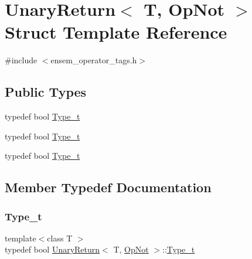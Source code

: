 \hypertarget{structUnaryReturn_3_01T_00_01OpNot_01_4}{}\section{Unary\+Return$<$ T, Op\+Not $>$ Struct Template Reference}
\label{structUnaryReturn_3_01T_00_01OpNot_01_4}


{\ttfamily \#include $<$ensem\+\_\+operator\+\_\+tags.\+h$>$}

\subsection*{Public Types}
\begin{DoxyCompactItemize}
\item 
typedef bool \mbox{\hyperlink{structUnaryReturn_3_01T_00_01OpNot_01_4_a3c2ea34de12d5f13e356568135a80bd9}{Type\+\_\+t}}
\item 
typedef bool \mbox{\hyperlink{structUnaryReturn_3_01T_00_01OpNot_01_4_a3c2ea34de12d5f13e356568135a80bd9}{Type\+\_\+t}}
\item 
typedef bool \mbox{\hyperlink{structUnaryReturn_3_01T_00_01OpNot_01_4_a3c2ea34de12d5f13e356568135a80bd9}{Type\+\_\+t}}
\end{DoxyCompactItemize}


\subsection{Member Typedef Documentation}
\mbox{\label{structUnaryReturn_3_01T_00_01OpNot_01_4_a3c2ea34de12d5f13e356568135a80bd9}} 
\subsubsection{\texorpdfstring{Type\_t}{Type\_t}\hspace{0.1cm}{\footnotesize\ttfamily [1/3]}}
{\footnotesize\ttfamily template$<$class T $>$ \\
typedef bool \mbox{\hyperlink{structUnaryReturn}{Unary\+Return}}$<$ T, \mbox{\hyperlink{structOpNot}{Op\+Not}} $>$\+::\mbox{\hyperlink{structUnaryReturn_3_01T_00_01OpNot_01_4_a3c2ea34de12d5f13e356568135a80bd9}{Type\+\_\+t}}}

\mbox{\label{structUnaryReturn_3_01T_00_01OpNot_01_4_a3c2ea34de12d5f13e356568135a80bd9}} 
